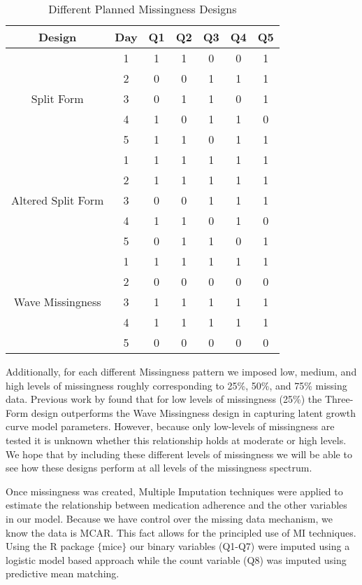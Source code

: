 \documentclass{svjour3}                     %
\begin{document}
\begin{table}[t!]
	\centering
	\caption{Different Planned Missingness Designs}
	\setlength{\tabcolsep}{0.45cm}
	\label{tab:table14}
	\hspace*{-1cm}
	\begin{tabular}{c|c|ccccc}
		\toprule
		Design & Day & Q1 & Q2 & Q3 & Q4 & Q5 \\
		\midrule
		\multirow{5}{*}{Split Form}
		& 1 & 1 & 1 & 0 & 0 & 1 \\
		& 2 & 0 & 0 & 1 & 1 & 1 \\
		& 3 & 0 & 1 & 1 & 0 & 1 \\
		& 4 & 1 & 0 & 1 & 1 & 0 \\
		& 5 & 1 & 1 & 0 & 1 & 1 \\
		\midrule
		\midrule
		\multirow{5}{*}{Altered Split Form}
		& 1 & 1 & 1 & 1 & 1 & 1 \\
		& 2 & 1 & 1 & 1 & 1 & 1 \\
		& 3 & 0 & 0 & 1 & 1 & 1 \\
		& 4 & 1 & 1 & 0 & 1 & 0 \\
		& 5 & 0 & 1 & 1 & 0 & 1 \\
		\midrule
		\midrule
		\multirow{5}{*}{Wave Missingness}
		& 1 & 1 & 1 & 1 & 1 & 1 \\
		& 2 & 0 & 0 & 0 & 0 & 0 \\
		& 3 & 1 & 1 & 1 & 1 & 1 \\
		& 4 & 1 & 1 & 1 & 1 & 1 \\
		& 5 & 0 & 0 & 0 & 0 & 0 \\
		\bottomrule
	\end{tabular}
	\hspace*{-1cm}	
\end{table}


Additionally, for each different Missingness pattern we imposed low, medium, and high levels of missingness roughly corresponding to 25\%, 50\%, and 75\% missing data. Previous work by \citet{rhemtulla2014planned} found that for low levels of missingness (25\%) the Three-Form design outperforms the Wave Missingness design in capturing latent growth curve model parameters. However, because only low-levels of missingness are tested it is unknown whether this relationship holds at moderate or high levels. We hope that by including these different levels of missingness we will be able to see how these designs perform at all levels of the missingness spectrum. \par
Once missingness was created, Multiple Imputation techniques were applied to estimate the relationship between medication adherence and the other variables in our model. Because we have control over the missing data mechanism, we know the data is MCAR. This fact allows for the principled use of MI techniques. Using the R package $\{$mice$\}$ \citep{mice2011imputation} our binary variables (Q1-Q7) were imputed using a logistic model based approach while the count variable (Q8) was imputed using predictive mean matching. \par
\end{document}
